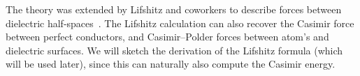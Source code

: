 The theory was extended by Lifshitz and coworkers to describe forces between dielectric half-spaces~\citep{Lifshitz1956,
Dzyaloshinskii1959,Dzyaloshinskii1961}.  The Lifshitz calculation can also recover the Casimir force between 
perfect conductors, and Casimir--Polder forces between atom's and dielectric surfaces.  
We will sketch the derivation of the Lifshitz formula (which will be used later),
since this can naturally also compute the Casimir energy.



